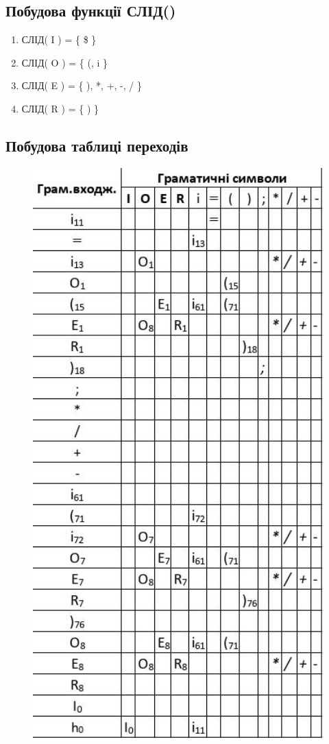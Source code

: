 \subsection{Побудова функції СЛІД()}
\begin{enumerate}
  \item СЛІД( I ) = \{ \$ \} 
  \item СЛІД( O ) = \{ (, i \} 
  \item СЛІД( E ) = \{ ), *, +, -, / \} 
  \item СЛІД( R ) = \{ ) \} 
\end{enumerate}

\clearpage
\subsection{Побудова таблиці переходів}
\begin{figure}[h!]
  \centering
  \includegraphics[width=12cm]{reports/formals/assets/go.jpeg}
\end{figure}

